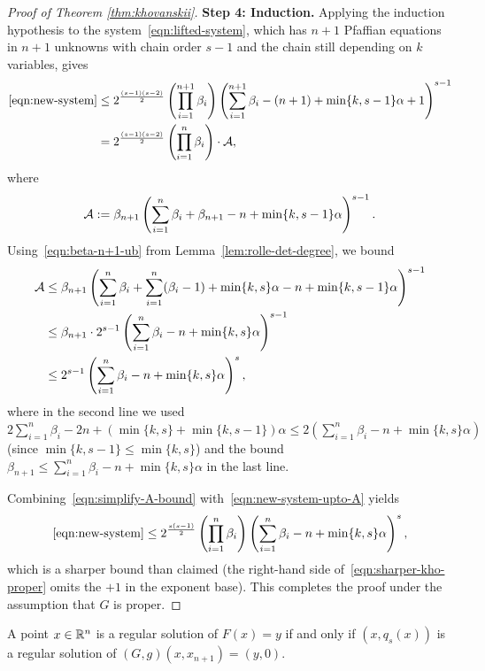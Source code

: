 \begin{proof}[Proof of Theorem \ref{thm:khovanskii}]
\medskip
\noindent\textbf{Step 4: Induction.}
Applying the induction hypothesis to the system~\eqref{eqn:lifted-system}, which has $n+1$ Pfaffian equations in $n+1$ unknowns with chain order $s-1$ and the chain still depending on $k$ variables, gives
\begin{align}
  \eqref{eqn:new-system} &\le 2^{\frac{(s-1)(s-2)}{2}} \left(\prod_{i=1}^{n+1} \beta_i\right) \left(\sum_{i=1}^{n+1}\beta_i - (n+1) + \min\{k,s-1\}\alpha + 1\right)^{s-1} \nonumber \\
  &= 2^{\frac{(s-1)(s-2)}{2}} \left(\prod_{i=1}^{n} \beta_i\right) \cdot \operatorname{\mathcal{A}}, \label{eqn:new-system-upto-A}
\end{align}
where
\begin{equation*}
  \operatorname{\mathcal{A}} := \beta_{n+1} \left(\sum_{i=1}^{n}\beta_i + \beta_{n+1} - n + \min\{k,s-1\}\alpha\right)^{s-1}.
\end{equation*}
Using~\eqref{eqn:beta-n+1-ub} from Lemma~\ref{lem:rolle-det-degree}, we bound
\begin{align}
  \operatorname{\mathcal{A}} &\le \beta_{n+1} \left(\sum_{i=1}^{n}\beta_i + \sum_{i=1}^n (\beta_i - 1) + \min\{k, s\}\alpha - n + \min\{k,s-1\}\alpha\right)^{s-1} \nonumber \\
  &\le \beta_{n+1} \cdot 2^{s-1}\left(\sum_{i=1}^{n}\beta_i - n + \min\{k,s\}\alpha\right)^{s-1} \nonumber \\
  &\le 2^{s-1}\left(\sum_{i=1}^{n}\beta_i - n + \min\{k,s\}\alpha\right)^{s}, \label{eqn:simplify-A-bound}
\end{align}
where in the second line we used $2\sum_{i=1}^n\beta_i - 2n + (\min\{k,s\}+\min\{k,s-1\})\alpha \le 2(\sum_{i=1}^n\beta_i - n + \min\{k,s\}\alpha)$ (since $\min\{k,s-1\}\le \min\{k,s\}$) and the bound $\beta_{n+1} \le \sum_{i=1}^n\beta_i - n + \min\{k,s\}\alpha$ in the last line.

Combining~\eqref{eqn:simplify-A-bound} with~\eqref{eqn:new-system-upto-A} yields
\begin{equation} \label{eqn:sharper-kho-proper}
  \eqref{eqn:new-system} \le 2^{\frac{s(s-1)}{2}}\left(\prod_{i=1}^n \beta_i \right)\left(\sum_{i=1}^{n}\beta_i - n + \min\{k,s\}\alpha\right)^s,
\end{equation}
which is a sharper bound than claimed (the right-hand side of~\eqref{eqn:sharper-kho-proper} omits the $+1$ in the exponent base). This completes the proof under the assumption that $G$ is proper.
\end{proof}

\begin{claim} \label{claim:regular-solutions}
  A point $x \in \mathbb{R}^n$ is a regular solution of $F(x) = y$ if and only if $(x, q_s(x))$ is a regular solution of $(G, g)(x, x_{n+1}) = (y, 0)$.
  \end{claim}
  
